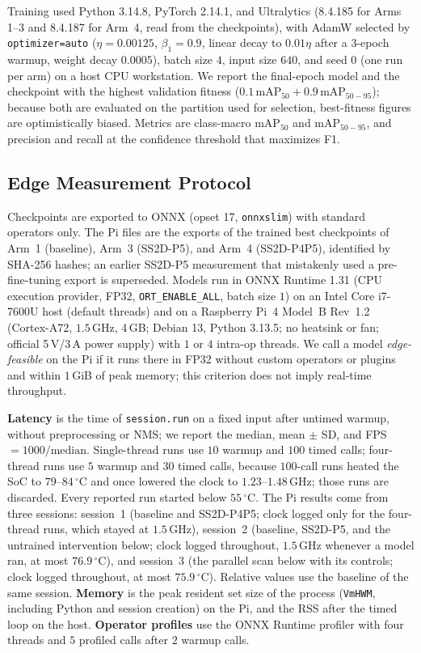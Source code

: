 Training used Python 3.14.8, PyTorch 2.14.1, and Ultralytics (8.4.185 for Arms 1--3 and 8.4.187 for Arm~4, read from the checkpoints), with AdamW selected by \texttt{optimizer=auto} ($\eta = 0.00125$, $\beta_1 = 0.9$, linear decay to $0.01\eta$ after a $3$-epoch warmup, weight decay $0.0005$), batch size $4$, input size $640$, and seed $0$ (one run per arm) on a host CPU workstation. We report the final-epoch model and the checkpoint with the highest validation fitness ($0.1\,\text{mAP}_{50} + 0.9\,\text{mAP}_{50-95}$); because both are evaluated on the partition used for selection, best-fitness figures are optimistically biased. Metrics are class-macro $\text{mAP}_{50}$ and $\text{mAP}_{50-95}$, and precision and recall at the confidence threshold that maximizes F1.

\subsection{Edge Measurement Protocol}
\label{sec:exp_export}
Checkpoints are exported to ONNX (opset 17, \texttt{onnxslim}) with standard operators only. The Pi files are the exports of the trained best checkpoints of Arm~1 (baseline), Arm~3 (SS2D-P5), and Arm~4 (SS2D-P4P5), identified by SHA-256 hashes; an earlier SS2D-P5 measurement that mistakenly used a pre-fine-tuning export is superseded. Models run in ONNX Runtime 1.31 (CPU execution provider, FP32, \texttt{ORT\_ENABLE\_ALL}, batch size $1$) on an Intel Core i7-7600U host (default threads) and on a Raspberry Pi~4 Model~B Rev~1.2 (Cortex-A72, $1.5$\,GHz, 4\,GB; Debian 13, Python 3.13.5; no heatsink or fan; official 5\,V/3\,A power supply) with $1$ or $4$ intra-op threads. We call a model \emph{edge-feasible} on the Pi if it runs there in FP32 without custom operators or plugins and within $1$\,GiB of peak memory; this criterion does not imply real-time throughput.

\textbf{Latency} is the time of \texttt{session.run} on a fixed input after untimed warmup, without preprocessing or NMS; we report the median, mean $\pm$ SD, and FPS $= 1000/\text{median}$. Single-thread runs use $10$ warmup and $100$ timed calls; four-thread runs use $5$ warmup and $30$ timed calls, because $100$-call runs heated the SoC to $79$--$84\,^{\circ}$C and once lowered the clock to $1.23$--$1.48$\,GHz; those runs are discarded. Every reported run started below $55\,^{\circ}$C. The Pi results come from three sessions: session~1 (baseline and SS2D-P4P5; clock logged only for the four-thread runs, which stayed at $1.5$\,GHz), session~2 (baseline, SS2D-P5, and the untrained intervention below; clock logged throughout, $1.5$\,GHz whenever a model ran, at most $76.9\,^{\circ}$C), and session~3 (the parallel scan below with its controls; clock logged throughout, at most $75.9\,^{\circ}$C). Relative values use the baseline of the same session. \textbf{Memory} is the peak resident set size of the process (\texttt{VmHWM}, including Python and session creation) on the Pi, and the RSS after the timed loop on the host. \textbf{Operator profiles} use the ONNX Runtime profiler with four threads and $5$ profiled calls after $2$ warmup calls.

